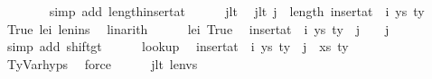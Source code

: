 \begin{isabellebody}
\ \ \ \ \ \ \isamarkupfalse%
\ {\isacharparenleft}{\kern0pt}simp\ add{\isacharcolon}{\kern0pt}\ length{\isacharunderscore}{\kern0pt}insert{\isacharunderscore}{\kern0pt}at{\isacharparenright}{\kern0pt}\isanewline
\isanewline
\ \ \ \ \isamarkupfalse%
\ j{\isacharunderscore}{\kern0pt}lt\ \isamarkupfalse%
\ j{\isacharunderscore}{\kern0pt}lt{\isacharprime}{\kern0pt}{\isacharcolon}{\kern0pt}\ {\isachardoublequoteopen}j\ {\isacharless}{\kern0pt}\ length\ {\isacharparenleft}{\kern0pt}insert{\isacharunderscore}{\kern0pt}at\ {\isasymGamma}\ i\ {\isacharparenleft}{\kern0pt}ys{\isacharcomma}{\kern0pt}\ ty{}{\isacharparenright}{\kern0pt}{\isacharparenright}{\kern0pt}{\isachardoublequoteclose}\isanewline
\ \ \isamarkupfalse%
\ True\ le{\isacharunderscore}{\kern0pt}i\ len{\isacharunderscore}{\kern0pt}ins\ \isamarkupfalse%
\ linarith\isanewline
\isanewline
\ \ \ \ \isamarkupfalse%
\ le{\isacharunderscore}{\kern0pt}i\ True\ \isamarkupfalse%
\ {\isachardoublequoteopen}{\isacharparenleft}{\kern0pt}insert{\isacharunderscore}{\kern0pt}at\ {\isasymGamma}\ i\ {\isacharparenleft}{\kern0pt}ys{\isacharcomma}{\kern0pt}\ ty{}{\isacharparenright}{\kern0pt}{\isacharparenright}{\kern0pt}\ {\isacharbang}{\kern0pt}\ j\ {\isacharequal}{\kern0pt}\ {\isasymGamma}\ {\isacharbang}{\kern0pt}\ j{\isachardoublequoteclose}\isanewline
\ \ \ \ \ \ \isamarkupfalse%
\ {\isacharparenleft}{\kern0pt}simp\ add{\isacharcolon}{\kern0pt}\ shift{\isacharunderscore}{\kern0pt}gt{\isacharparenright}{\kern0pt}\isanewline
\isanewline
\ \ \ \ \isamarkupfalse%
\ lookup\ \isamarkupfalse%
\ {\isachardoublequoteopen}{\isacharparenleft}{\kern0pt}insert{\isacharunderscore}{\kern0pt}at\ {\isasymGamma}\ i\ {\isacharparenleft}{\kern0pt}ys{\isacharcomma}{\kern0pt}\ ty{}{\isacharparenright}{\kern0pt}{\isacharparenright}{\kern0pt}\ {\isacharbang}{\kern0pt}\ j\ {\isacharequal}{\kern0pt}\ {\isacharparenleft}{\kern0pt}xs{\isacharcomma}{\kern0pt}\ ty{\isacharparenright}{\kern0pt}{\isachardoublequoteclose}\isanewline
\ \ \ \ \ \ \isamarkupfalse%
\ TyVar{\isachardot}{\kern0pt}hyps{\isacharparenleft}{\kern0pt}{}{\isacharparenright}{\kern0pt}\ \isamarkupfalse%
\ force\isanewline
\isanewline
\ \ \ \ \isamarkupfalse%
\ j{\isacharunderscore}{\kern0pt}lt{\isacharprime}{\kern0pt}\ len{\isacharunderscore}{\kern0pt}vs\isanewline
\ \ \ \ \isamarkupfalse%

\end{isabellebody}
